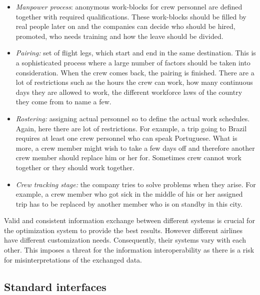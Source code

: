 \begin{itemize}
\item {\em Manpower process}: %
anonymous work-blocks for crew personnel are defined together with required qualifications. These work-blocks %
should be filled by real people later on and the companies can decide who should be hired, promoted, who needs training and how the leave should be divided.
\item {\em Pairing:} set of flight legs, which start and end in the same destination. This is a sophisticated process where a large number of factors should be taken into consideration.  When the crew comes back, the pairing is finished. 
There are a lot of restrictions such as the hours the crew can work, how many continuous days they are allowed to work, the different workforce laws of the country they come from to name a few. 
\item {\em Rostering:} 
assigning actual personnel so to define the %
actual work schedules. Again, here there are lot of restrictions. For example, a trip going to Brazil requires at least one crew personnel who can speak Portuguese. What is more, a crew member might wish to take a few days off and therefore another crew member should replace him or her for. Sometimes crew cannot work together or they should work together. 
\item {\em Crew tracking stage:}
the company tries to solve problems when they arise. For example, a crew member who got sick in the middle of his or her assigned trip has to be replaced by another member who is on standby in this city.  
\end{itemize}

Valid and consistent information exchange between different systems is crucial for the optimization system to provide the best results. However different airlines have different customization needs. Consequently, their systems vary with each other. This imposes a threat for the information interoperability as there is a risk for misinterpretations of the exchanged data.  



\subsection{Standard interfaces }

